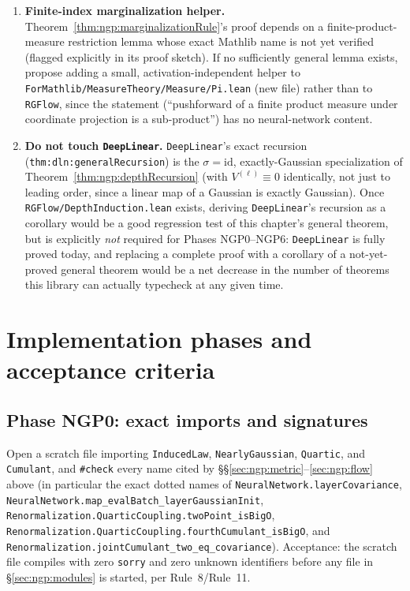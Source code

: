 \begin{enumerate}
    \texttt{covarianceWith} in the sense of \texttt{Renormalization.Perturbation.covarianceWith};
    no bespoke ``bracket of a bracket'' notation should be introduced in \texttt{RGFlow}.
  \item \textbf{Finite-index marginalization helper.} Theorem~\ref{thm:ngp:marginalizationRule}'s
    proof depends on a finite-product-measure restriction lemma whose exact Mathlib name is not
    yet verified (flagged explicitly in its proof sketch). If no sufficiently general lemma exists,
    propose adding a small, activation-independent helper to
    \texttt{ForMathlib/MeasureTheory/Measure/Pi.lean} (new file) rather than to \texttt{RGFlow},
    since the statement (``pushforward of a finite product measure under coordinate projection is
    a sub-product'') has no neural-network content.
  \item \textbf{Do not touch \texttt{DeepLinear}.} \texttt{DeepLinear}'s exact recursion
    (\texttt{thm:dln:generalRecursion}) is the $\sigma=\mathrm{id}$, exactly-Gaussian
    specialization of Theorem~\ref{thm:ngp:depthRecursion} (with $V^{(\ell)}\equiv0$ identically,
    not just to leading order, since a linear map of a Gaussian is exactly Gaussian). Once
    \texttt{RGFlow/DepthInduction.lean} exists, deriving \texttt{DeepLinear}'s recursion as a
    corollary would be a good regression test of this chapter's general theorem, but is explicitly
    \emph{not} required for Phases NGP0--NGP6: \texttt{DeepLinear} is fully proved today, and
    replacing a complete proof with a corollary of a not-yet-proved general theorem would be a net
    decrease in the number of theorems this library can actually typecheck at any given time.
\end{enumerate}

\section{Implementation phases and acceptance criteria}
\label{sec:ngp:phases}

\subsection*{Phase NGP0: exact imports and signatures}
Open a scratch file importing \texttt{InducedLaw}, \texttt{NearlyGaussian}, \texttt{Quartic}, and
\texttt{Cumulant}, and \texttt{\#check} every name cited by
\S\S\ref{sec:ngp:metric}--\ref{sec:ngp:flow} above (in particular the exact dotted names of
\texttt{NeuralNetwork.layerCovariance}, \texttt{NeuralNetwork.map\_evalBatch\_layerGaussianInit},
\texttt{Renormalization.QuarticCoupling.twoPoint\_isBigO},
\texttt{Renormalization.QuarticCoupling.fourthCumulant\_isBigO}, and
\texttt{Renormalization.jointCumulant\_two\_eq\_covariance}). Acceptance: the scratch file compiles
with zero \texttt{sorry} and zero unknown identifiers before any file in
\S\ref{sec:ngp:modules} is started, per Rule~8/Rule~11.

